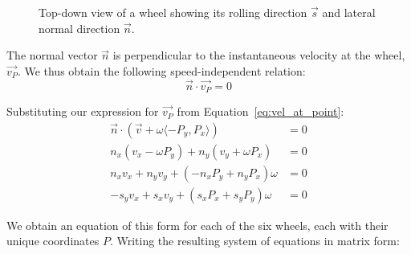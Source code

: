 \documentclass{article}
\begin{document}
\begin{figure}[ht]
\centering
{}
\caption{Top-down view of a wheel showing its rolling direction $\vec{s}$ and lateral normal direction $\vec{n}$.}
\label{fig:wheel_vectors}
\end{figure}

The normal vector $\vec{n}$ is perpendicular to the instantaneous velocity at the wheel, $\vec{v_P}$. We thus obtain the following speed-independent relation:
\begin{equation}
\label{eq:normal}
    \vec{n} \cdot \vec{v_P} = 0
\end{equation}

Substituting our expression for $\vec{v_P}$ from Equation~\ref{eq:vel_at_point}:
\begin{align*}
    \vec{n} \cdot (\vec{v} + \omega \langle -P_y, P_x \rangle) &= 0 \\
    n_x(v_x - \omega P_y) + n_y(v_y + \omega P_x) &= 0 \\
    n_x v_x + n_y v_y + (-n_x P_y + n_y P_x)\omega &= 0 \\
    -s_y v_x + s_x v_y + (s_x P_x + s_y P_y)\omega &= 0
\end{align*}

We obtain an equation of this form for each of the six wheels, each with their unique coordinates $P$. Writing the resulting system of equations in matrix form:
\end{document}
